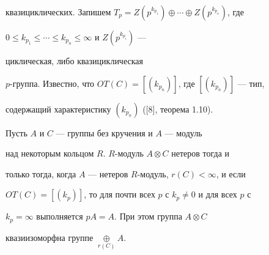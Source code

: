 квазициклических. Запишем $T_p=Z(p^{k_{p_1}})\oplus\dotsb\oplus 


Z(p^{k_{p_n}})$, где 


$0\le k_{p_1}\le\dotsb \le k_{p_n}\le\infty$ и $Z(p^{k_{p_i}})$ --- 


циклическая, либо квазициклическая 


$p$-группа. Известно, что $OT(C)=[(k_{p_n})]$, где $[(k_{p_n})]$ --- тип, 


содержащий характеристику $(k_{p_n})$ ([8], теорема 1.10). 


 


\begin{props} 


Пусть $A$ и $C$ --- группы без кручения и $A$ --- модуль 


над некоторым кольцом $R$.\; $R$-модуль $A\otimes C$ нетеров тогда и 


только тогда, когда $A$ --- нетеров $R$-модуль, $r(C)<\infty$, и если 


$OT(C)=[(k_p)]$, то для почти всех $p$ с $k_p\ne0$ и для всех $p$ с 


$k_p=\infty$ выполняется $pA=A$. При этом группа $A\otimes C$ 


квазиизоморфна группе $\mathop{\oplus}\limits_{r(C)}A$. 


\end{props} 


 


